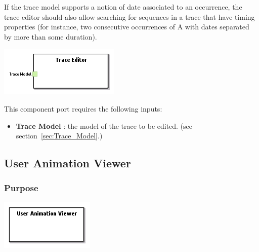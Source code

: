 \documentclass{gemoc} %
\begin{document}
If the trace model supports a notion of date associated to an occurrence, the trace editor should also allow searching for sequences in a trace that have timing properties (for instance, two consecutive occurrences of A with dates separated by more than some duration).

\begin{center}
\includegraphics*[trim=0.0cm 0.0cm 0cm 0.0cm, clip=true]{../images/generated/Generated_Trace_Editor.png}
\end{center}

This component port requires the following inputs:
\begin{itemize}
  \item \textbf{Trace Model} :
the model of the trace to be edited.
(see section~\ref{sec:Trace_Model}.)
\end{itemize}



\subsection{User Animation Viewer}
\label{sec:User_Animation_Viewer}


\subsubsection{Purpose}


\begin{center}
\includegraphics*[trim=0.0cm 0.0cm 0cm 0.0cm, clip=true]{../images/generated/Generated_User_Animation_Viewer.png}
\end{center}
\end{document}
